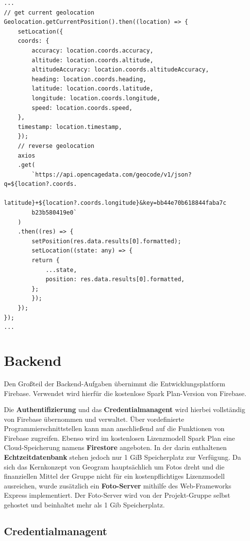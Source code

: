 \begin{lstlisting}[label=lst:codeGeolocation, caption={Impelementierung der GPS-Abfrage}, captionpos=b, breaklines=true]
...
// get current geolocation
Geolocation.getCurrentPosition().then((location) => {
    setLocation({
    coords: {
        accuracy: location.coords.accuracy,
        altitude: location.coords.altitude,
        altitudeAccuracy: location.coords.altitudeAccuracy,
        heading: location.coords.heading,
        latitude: location.coords.latitude,
        longitude: location.coords.longitude,
        speed: location.coords.speed,
    },
    timestamp: location.timestamp,
    });
    // reverse geolocation
    axios
    .get(
        `https://api.opencagedata.com/geocode/v1/json?q=${location?.coords.
        latitude}+${location?.coords.longitude}&key=bb44e70b618844faba7c
        b23b580419e0`
    )
    .then((res) => {
        setPosition(res.data.results[0].formatted);
        setLocation((state: any) => {
        return {
            ...state,
            position: res.data.results[0].formatted,
        };
        });
    });
});
...
\end{lstlisting}

\section{Backend\label{sec3.2:Unterpunkt-2}}

Den Großteil der Backend-Aufgaben übernimmt die Entwicklungsplatform Firebase. Verwendet wird hierfür die kostenlose \glqq Spark Plan\grqq{}-Version von Firebase. 

Die \textbf{Authentifizierung} und das \textbf{Credentialmanagent} wird hierbei vollständig von Firebase übernommen und verwaltet. Über vordefinierte Programmierschnittstellen kann man anschließend auf die Funktionen von Firebase zugreifen. Ebenso wird im kostenlosen Lizenzmodell \glqq Spark Plan\grqq{} eine Cloud-Speicherung namens \glqq \textbf{Firestore}\grqq{} angeboten. In der darin enthaltenen \textbf{Echtzeitdatenbank} stehen jedoch nur 1 GiB Speicherplatz zur Verfügung. Da sich das Kernkonzept von Geogram hauptsächlich um Fotos dreht und die finanziellen Mittel der Gruppe nicht für ein kostenpflichtiges Lizenzmodell ausreichen, wurde zusätzlich ein \textbf{Foto-Server} mithilfe des Web-Frameworks \glqq Express\grqq{} implementiert. Der Foto-Server wird von der Projekt-Gruppe selbst gehostet und beinhaltet mehr als 1 Gib Speicherplatz.

\subsection{Credentialmanagent\label{sup3.2.1:Unterpunkt-1}}

